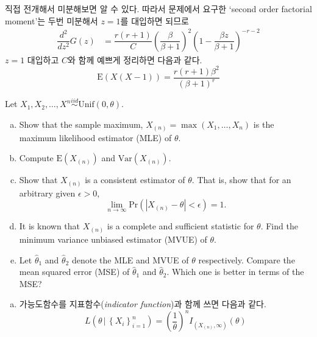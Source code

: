 \documentclass[answers]{exam}
\begin{document}
\begin{questions}
\begin{solution}
\begin{enumerate}[(a)]
\begin{equation}
      \end{equation}
      직접 전개해서 미분해보면 알 수 있다. 따라서 문제에서 요구한 `second order factorial moment'는 두번 미분해서 $z=1$를 대입하면 되므로
      \begin{align}
        \dfrac{d^{2}}{dz^{2}}G\left(z\right) &= \dfrac{r\left(r+1\right)}{C}\left(\dfrac{\beta}{\beta+1}\right)^{2}\left(1-\dfrac{\beta z}{\beta+1}\right)^{-r-2}
      \end{align}
      $z=1$ 대입하고 $C$와 함께 예쁘게 정리하면 다음과 같다.
      \begin{equation}
        \mathrm{E}\left(X\left(X-1\right)\right) = \dfrac{r\left(r+1\right)\beta^{2}}{\left(\beta+1\right)^{r}}
      \end{equation}
    \end{enumerate}
    \end{solution}
    \question
    Let $X_{1},X_{2},\ldots,X^{n}\overset{iid}{\sim}\mathrm{Unif}\left(0,\theta\right)$.
    \begin{enumerate}[(a)]
      \item Show that the sample maximum, $X_{\left(n\right)}=\max\left(X_{1},\ldots,X_{n}\right)$ is the maximum likelihood estimator (MLE) of $\theta$.
      \item Compute $\mathrm{E}\left(X_{\left(n\right)}\right)$ and $\mathrm{Var}\left(X_{\left(n\right)}\right)$.
      \item Show that $X_{\left(n\right)}$ is a consistent estimator of $\theta$. That is, show that for an arbitrary given $\epsilon >0$,
      $$
        \lim_{n\to\infty}\mathrm{Pr}\left(\left|X_{\left(n\right)}-\theta\right|<\epsilon\right)=1.
      $$
      \item It is known that $X_{\left(n\right)}$ is a complete and sufficient statistic for $\theta$. Find the minimum variance unbiased estimator (MVUE) of $\theta$.
      \item Let $\widehat{\theta}_{1}$ and $\widehat{\theta}_{2}$ denote the MLE and MVUE of $\theta$ respectively. Compare the mean squared error (MSE) of $\widehat{\theta}_{1}$ and $\widehat{\theta}_{2}$. Which one is better in terms of the MSE?
    \end{enumerate}
    \begin{solution}
      \begin{enumerate}[(a)]
        \item 가능도함수를 지표함수(\emph{indicator function})과 함께 쓰면 다음과 같다.
        \begin{equation}
          L\left(\theta\,|\,\left\{X_{i}\right\}_{i=1}^{n}\right) = \left(\dfrac{1}{\theta}\right)^{n}I_{\left(X_{\left(n\right)},\infty\right)}\left(\theta\right)

\end{equation}
\end{enumerate}
\end{solution}
\end{questions}
\end{document}
